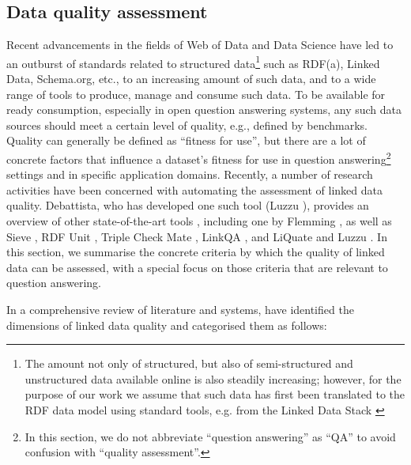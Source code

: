 \documentclass{article}
\begin{document}
\subsection{Data quality assessment}
\label{dataqaintro}
Recent advancements in the fields of Web of Data and Data Science have led to an outburst of standards related to structured data\footnote{The amount not only of structured, but also of semi-structured and unstructured data available online is also steadily increasing; however, for the purpose of our work we assume that such data has first been translated to the RDF data model using standard tools, e.g. from the Linked Data Stack \cite{aue+11} } such as RDF(a), Linked Data, Schema.org, etc., to an increasing amount of such data, and to a wide range of tools to produce, manage and consume such data. To be available for ready consumption, especially in open question answering systems, any such data sources should meet a certain level of quality, e.g., defined by benchmarks. Quality can generally be defined as “fitness for use”, but there are a lot of concrete factors that influence a dataset’s fitness for use in question answering\footnote{In this section, we do not abbreviate ``question answering'' as ``QA'' to avoid confusion with ``quality assessment''.} settings and in specific application domains. Recently, a number of research activities have been concerned with automating the assessment of linked data quality. Debattista, who has developed one such tool (Luzzu \cite{debattista2015luzzu}), provides an overview of other state-of-the-art tools \cite{debattista2014luzzu}, including one by Flemming \cite{Flemming2008}, as well as Sieve \cite{mendes2012sieve}, RDF Unit \cite{kontokostas2014test}, Triple Check Mate \cite{zaveri2013user}, LinkQA \cite{gueret2012assessing}, and LiQuate \cite{ruckhaus2013analyzing} and Luzzu \cite{debattista2015luzzu}. In this section, we summarise the concrete criteria by which the quality of linked data can be assessed, with a special focus on those criteria that are relevant to question answering.

In a comprehensive review of literature and systems, \cite{Zaveri2012:LODQ} have identified the dimensions of linked data quality and categorised them as follows:
\end{document}
